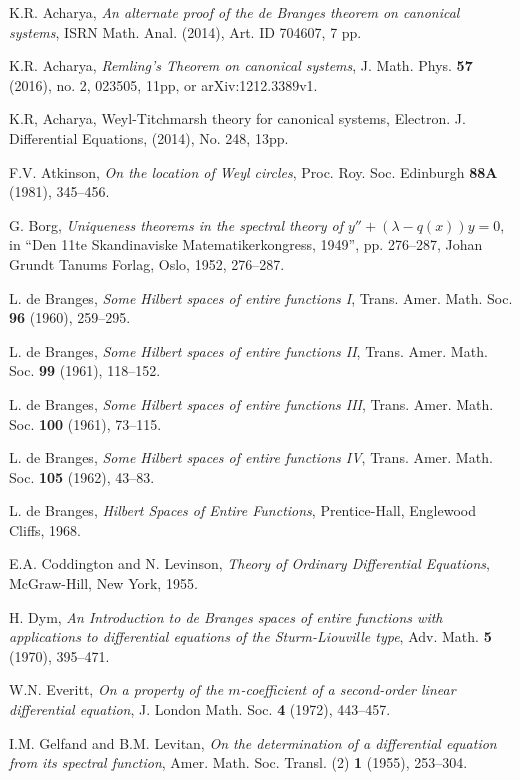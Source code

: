 \documentclass[preprint,12pt]{elsarticle}
\begin{document}
\begin{thebibliography}{10000}
 K.R. Acharya, \textit{An alternate proof of the de Branges theorem on canonical systems}, 
ISRN Math. Anal. (2014), Art. ID 704607, 7 pp.

 K.R. Acharya, \textit{Remling's Theorem on canonical systems}, J. Math. Phys. \textbf{57} (2016), no. 2, 023505, 11pp, or arXiv:1212.3389v1.

 K.R, Acharya, Weyl-Titchmarsh theory for canonical systems, 
Electron. J. Differential Equations, (2014), No. 248, 13pp.

 F.V. Atkinson, \textit{On the location of Weyl circles}, Proc. Roy. Soc. Edinburgh \textbf{88A} (1981), 345--456.

G. Borg, \textit{Uniqueness theorems in the spectral theory of $y''+(\lambda-q(x))y=0$}, in ``Den 11te Skandinaviske Matematikerkongress, 1949'', pp. 276--287, Johan Grundt Tanums Forlag, Oslo, 1952, 276--287.

 L. de Branges, \textit{Some Hilbert spaces of entire functions I},  
Trans. Amer. Math. Soc. \textbf{96} (1960), 259--295.

 L. de Branges, \textit{Some Hilbert spaces of entire functions II}, 
Trans. Amer. Math. Soc. \textbf{99} (1961), 118--152.

 L. de Branges, \textit{Some Hilbert spaces of entire functions III}, 
Trans. Amer. Math. Soc. \textbf{100} (1961), 73--115.

 L. de Branges, \textit{Some Hilbert spaces of entire functions IV}, 
Trans. Amer. Math. Soc. \textbf{105} (1962), 43--83.

 L. de Branges, \textit{Hilbert Spaces of Entire Functions}, Prentice-Hall, Englewood Cliffs, 1968.

 E.A. Coddington and N. Levinson, \textit{Theory of Ordinary Differential Equations}, McGraw-Hill, New York, 1955.

 H. Dym, \textit{An Introduction to de Branges spaces of entire functions with applications to differential equations of the Sturm-Liouville type}, Adv. Math. \textbf{5} (1970), 395--471.

 W.N. Everitt, \textit{On a property of the $m$-coefficient of a second-order linear differential equation},
J. London Math. Soc. \textbf{4} (1972), 443--457.

 I.M. Gelfand and B.M. Levitan, \textit{On the determination of a differential equation from its spectral function}, 
Amer. Math. Soc. Transl. (2) \textbf{1} (1955), 253--304.


\end{thebibliography}
\end{document}
